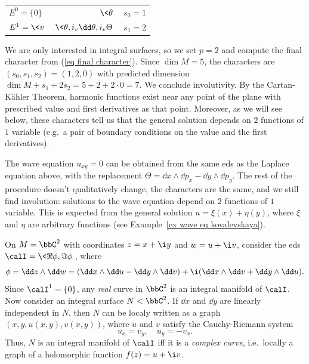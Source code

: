\begin{example}
\begin{center}
\begin{tabular}{l r r}
         \hline
         $E^0=\{0\}$ & $\<\theta\>$ & $s_0=1$ \\ 
         $E^1=\<v\>$ & $\<\theta,i_v\dd\theta,i_v\Theta\>$ & $s_1=2$ \\
         \hline
        \end{tabular}
    \end{center}
    We are only interested in integral surfaces, so we set $p=2$ and compute the final character from (\ref{eq final character}). Since $\dim M=5$, the characters are $(s_0,s_1,s_2)=(1,2,0)$ with predicted dimension $\dim M+s_1+2s_2=5+2+2\cdot 0=7$. We conclude involutivity. By the Cartan-K\"ahler Theorem, harmonic functions exist near any point of the plane with prescribed value and first derivatives as that point. Moreover, as we will see below, these characters tell us that the general solution depends on $2$ functions of $1$ variable (e.g.\ a pair of boundary conditions on the value and the first derivatives).
\end{example}

\begin{example}
    The wave equation $u_{xy}=0$ can be obtained from the same \gls{eds} as the Laplace equation above, with the replacement $\Theta=\dd x\wedge\dd p_x-\dd y\wedge\dd p_y$. The rest of the procedure doesn't qualitatively change, the characters are the same, and we still find involution: solutions to the wave equation depend on $2$ functions of $1$ variable. This is expected from the general solution $u=\xi(x)+\eta(y)$, where $\xi$ and $\eta$ are arbitrary functions (see Example~\ref{ex wave eq kovalevskaya}).
\end{example}

\begin{example}
    On $M=\bbC^2$ with coordinates $z=x+\i y$ and $w=u+\i v$, consider the \gls{eds} $\calI=\<\Re \phi,\Im \phi\>$, where 
    \[\phi =\dd z\wedge \dd w=(\dd x\wedge \dd u-\dd y\wedge\dd v)+\i (\dd x\wedge\dd v+\dd y\wedge \dd u).\]
    Since $\calI^1=\{0\}$, any \emph{real} curve in $\bbC^2$ is an integral manifold of $\calI$. Now consider an integral surface $N<\bbC^2$. If $\dd x$ and $\dd y$ are linearly independent in $N$, then $N$ can be localy written as a graph $(x,y,u(x,y),v(x,y))$, where $u$ and $v$ satisfy the Cauchy-Riemann system
    \[u_x=v_y,\quad u_y=-v_x.\]
    Thus, $N$ is an integral manifold of $\calI$ iff it is a \emph{complex curve}, i.e.\ locally a graph of a holomorphic function $f(z)=u+\i v$.
\end{example}


